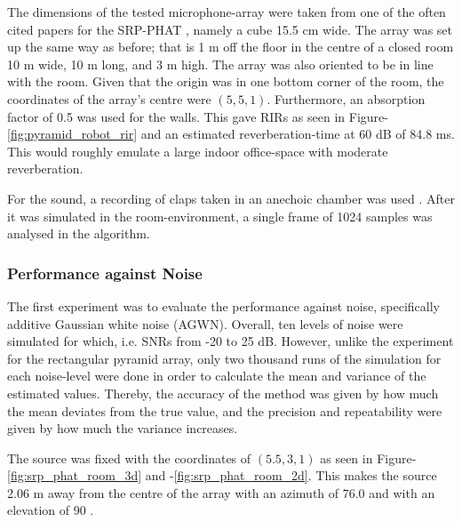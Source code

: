 \documentclass[notitlepage]{report}
\begin{document}
The dimensions of the tested microphone-array were taken from one of the often cited papers for the SRP-PHAT \cite{valin_robust_2007}, namely a cube 15.5 \si{cm} wide. The array was set up the same way as before; that is 1 \si{m} off the floor in the centre of a closed room 10 \si{m} wide, 10 \si{m} long, and 3 \si{m} high. The array was also oriented to be in line with the room. Given that the origin was in one bottom corner of the room, the coordinates of the array's centre were $(5,5,1)$. Furthermore, an absorption factor of 0.5 was used for the walls. This gave RIRs as seen in Figure-\ref{fig:pyramid_robot_rir} and an estimated reverberation-time at 60 \si{dB} of 84.8 \si{ms}. This would roughly emulate a large indoor office-space with moderate reverberation.

For the sound, a recording of claps taken in an anechoic chamber was used \cite{noauthor_handclaps_2005}. After it was simulated in the room-environment, a single frame of 1024 samples was analysed in the algorithm.

\subsubsection{Performance against Noise}

The first experiment was to evaluate the performance against noise, specifically additive Gaussian white noise (AGWN). Overall, ten levels of noise were simulated for which, i.e. SNRs from -20 to 25 \si{dB}. However, unlike the experiment for the rectangular pyramid array, only two thousand runs of the simulation for each noise-level were done in order to calculate the mean and variance of the estimated values. Thereby, the accuracy of the method was given by how much the mean deviates from the true value, and the precision and repeatability were given by how much the variance increases.

The source was fixed with the coordinates of $(5.5,3,1)$  as seen in Figure-\ref{fig:srp_phat_room_3d} and -\ref{fig:srp_phat_room_2d}. This makes the source 2.06 \si{m} away from the centre of the array with an azimuth of 76.0 \si{\deg} and with an elevation of 90 \si{\deg}.
\end{document}
